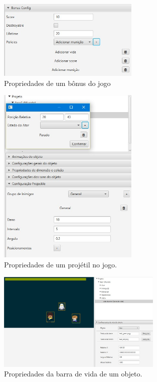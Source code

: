 \documentclass[12pt,oneside,openright,a4paper,english,brazil,sumario=tradicional]{abntex2}
\begin{document}
\begin{anexosenv}
   \begin{figure}[H]
   \centering
   \includegraphics[width=0.6\textwidth]{images/bonus_props.jpg}
   \caption{Propriedades de um bônus do jogo}
   \label{fig:bonus_props}
   \end{figure}

   \begin{figure}[H]
   \centering
   \includegraphics[width=0.6\textwidth]{images/projec_props.jpg}
   \caption{Propriedades de um projétil no jogo.}
   \label{fig:project_props}
   \end{figure}

   \begin{figure}[H]
   \centering
   \includegraphics[width=0.7\textwidth]{images/lifebar_props.jpg}
   \caption{Propriedades da barra de vida de um objeto.}
   \label{fig:lifebar_props}
   \end{figure}




\end{anexosenv}
\end{document}
